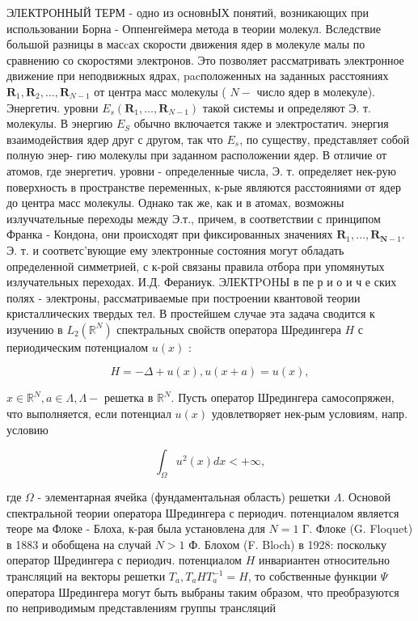 \documentclass[10pt]{article}
\begin{document}
ЭЛЕКТРОННЫЙ ТЕРМ - одно из основнЫХ понятий, возникающих при использовании Борна - Оппенгеймера метода в теории молекул. Вследствие большой разницы в масcах скорости движения ядер в молекуле малы по сравнению со скоростями электронов. Это позволяет рассматривать электронное движение при неподвижных ядрах, pacположенных на заданных расстояниях $\boldsymbol{R}_{1}, \boldsymbol{R}_{2}, \ldots, \boldsymbol{R}_{N-1}$ от центра масс молекулы ( $N-$ число ядер в молекуле). Энергетич. уровни $E_{s}\left(\boldsymbol{R}_{1}, \ldots, \boldsymbol{R}_{N-1}\right)$ такой системы и определяют Э. т. молекулы. В энергию $E_{S}$ обычно включается также и электростатич. энергия взаимодействия ядер друг с другом, так что $E_{s}$, по существу, представляет собой полную энер- гию молекулы при заданном расположении ядер. В отличие от атомов, где энергетич. уровни - определенные числа, Э. т. определяет нек-рую поверхность в пространстве переменных, к-рые являются расстояниями от ядер до центра масс молекулы. Однако так же, как и в атомах, возможны излуччательные переходы между Э.т., причем, в соответствии с принципом Франка - Кондона, они происходят при фиксированных значениях $\boldsymbol{R}_{1}, \ldots, \boldsymbol{R}_{\boldsymbol{N}-1}$. Э. т. и соответс'вующие ему электронные состояния могут обладать определенной симметрией, с к-рой связаны правила отбора при упомянутых излучательных переходах. И.Д. Фераниук. ЭЛЕКТPOHЫ в пе р и о и ч е ских полях - электроны, рассматриваемые при построении квантовой теории кристаллических твердых тел. В простейшем случае эта задача сводится к изучению в $L_{2}\left(\mathbb{R}^{N}\right)$ спектральных свойств оператора Шредингера $H$ с периодическим потенциалом $u(x)$ :



\[

H=-\Delta+u(x), u(x+a)=u(x),

\]



$x \in \mathbb{R}^{N}, a \in \Lambda, \Lambda-$ решетка в $\mathbb{R}^{N}$. Пусть оператор Шредингера самосопряжен, что выполняется, если потенциал $u(x)$ удовлетворяет нек-рым условиям, напр. условию



\[

\int_{\Omega} u^{2}(x) d x<+\infty,

\]



где $\Omega$ - элементарная ячейка (фундаментальная область) решетки $\Lambda$. Основой спектральной теории оператора Шредингера с периодич. потенциалом является теоре ма Флоке - Блоха, к-рая была установлена для $N=1$ Г. Флоке (G. Floquet) в 1883 и обобщена на случай $N>1$ Ф. Блохом (F. Bloch) в 1928: поскольку оператор Шредингера с периодич. потенциалом $H$ инвариантен относительно трансляций на векторы решетки $T_{a}, T_{a} H T_{a}^{-1}=H$, то собственные функции $\Psi$ оператора Шредингера могут быть выбраны таким образом, что преобразуются по неприводимым представлениям группы трансляций
\end{document}
